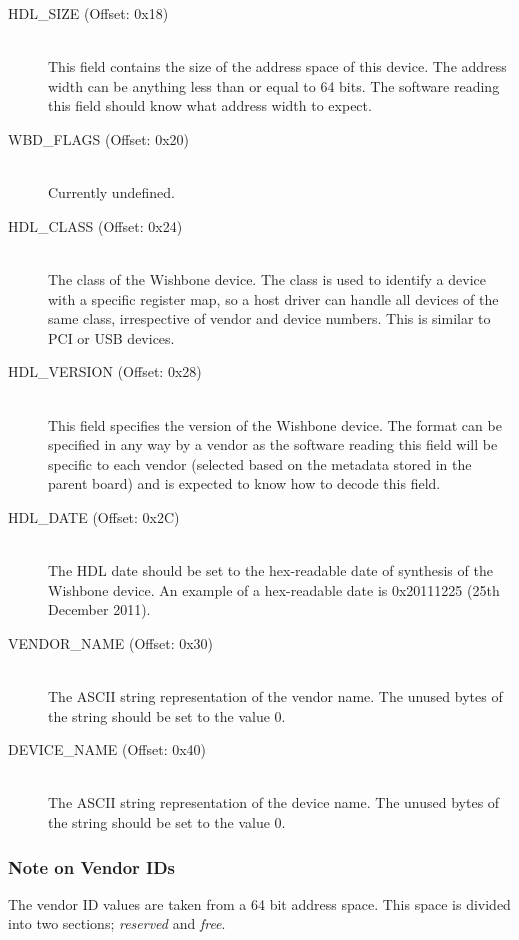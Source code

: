 \documentclass{article}
\begin{document}
\begin{description}
\item[HDL\_SIZE (Offset: 0x18)] \hfill \\
This field contains the size of the address space of this device. The address width
can be anything less than or equal to 64 bits. The software reading this
field should know what address width to expect.

\item[WBD\_FLAGS (Offset: 0x20)] \hfill \\
Currently undefined.

\item[HDL\_CLASS (Offset: 0x24)] \hfill \\
The class of the Wishbone device. The class is used to identify a device
with a specific register map, so a host driver can handle all devices of
the same class, irrespective of vendor and device numbers. This is similar
to PCI or USB devices.

\item[HDL\_VERSION (Offset: 0x28)] \hfill \\
This field specifies the version of the Wishbone device. The format can be
specified in any way by a vendor as the software reading this field will be
specific to each vendor (selected based on the metadata stored in the
parent board) and is expected to know how to decode this field.

\item[HDL\_DATE (Offset: 0x2C)] \hfill \\
The HDL date should be set to the hex-readable date of synthesis of
the Wishbone device. An example of a hex-readable date is 0x20111225 (25th
December 2011).

\item[VENDOR\_NAME (Offset: 0x30)] \hfill \\
The ASCII string representation of the vendor name. The unused bytes of the
string should be set to the value 0.

\item[DEVICE\_NAME (Offset: 0x40)] \hfill \\
The ASCII string representation of the device name. The unused bytes of the
string should be set to the value 0.
\end{description}

\subsubsection{Note on Vendor IDs}
The vendor ID values are taken from a 64 bit address space.
This space is divided into two sections; \emph{reserved} and \emph{free}.
\end{document}
